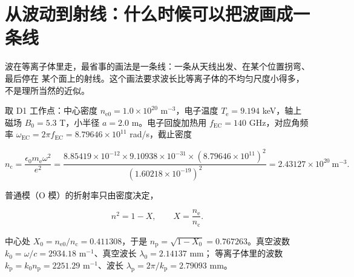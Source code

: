 
\section{从波动到射线：什么时候可以把波画成一条线}
\label{sec:app-as-wkb}

波在等离子体里走，最省事的画法是一条线：一条从天线出发、在某个位置拐弯、最后停在
某个面上的射线。这个画法要求波长比等离子体的不均匀尺度小得多，不是理所当然的近似。

取 D1 工作点：中心密度 $n_\mathrm{e0}=1.0\times10^{20}$ m$^{-3}$，电子温度
$T_\mathrm{e}=9.194$ keV，轴上磁场 $B_0=5.3$ T，小半径 $a=2.0$ m。电子回旋加热用
$f_\mathrm{EC}=140$ GHz，对应角频率 $\omega_\mathrm{EC}=2\pi f_\mathrm{EC}
=8.79646\times10^{11}$ rad/s，截止密度

\begin{equation}
n_\mathrm{c}=\frac{\epsilon_0 m_\mathrm{e}\omega^2}{e^2}
=\frac{8.85419\times10^{-12}\times9.10938\times10^{-31}\times
(8.79646\times10^{11})^2}{(1.60218\times10^{-19})^2}
=2.43127\times10^{20}\ \mathrm{m^{-3}}.
\label{eq:app-as-dispersion}
\end{equation}

普通模（O 模）的折射率只由密度决定，

\begin{equation}
n^2=1-X,\qquad X=\frac{n_\mathrm{e}}{n_\mathrm{c}} .
\label{eq:app-as-wkb}
\end{equation}

中心处 $X_0=n_\mathrm{e0}/n_\mathrm{c}=0.411308$，于是 $n_\mathrm{p}=\sqrt{1-X_0}
=0.767263$。真空波数 $k_0=\omega/c=2934.18$ m$^{-1}$、真空波长 $\lambda_0=2.14137$ mm；
等离子体里的波数 $k_\mathrm{p}=k_0 n_\mathrm{p}=2251.29$ m$^{-1}$、波长
$\lambda_\mathrm{p}=2\pi/k_\mathrm{p}=2.79093$ mm。

